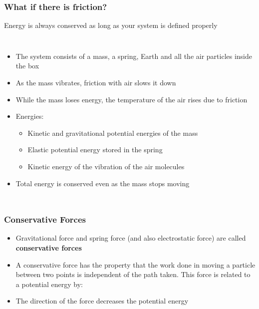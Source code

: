 \documentclass[12pt,compress,aspectratio=169]{beamer}
\newcommand{\eq}[2]{\vspace{#1}{\Large\begin{displaymath}#2\end{displaymath}}}
\begin{document}
\begin{frame}
  \frametitle{What if there is friction?}
  Energy is always conserved as long as your system is defined properly

  \begin{columns}
    \begin{itemize}
    \item The system consists of a mass, a spring, Earth and all the air
      particles inside the box
    \item As the mass vibrates, friction with air slows it down
    \item While the mass loses energy, the temperature of the air rises due to
      friction
    \item Energies:
      \begin{itemize}
      \item Kinetic and gravitational potential energies of the mass
      \item Elastic potential energy stored in the spring
      \item Kinetic energy of the vibration of the air molecules
      \end{itemize}
    \item Total energy is conserved even as the mass stops moving
    \end{itemize}
  \end{columns}
\end{frame}



\begin{frame}
  \frametitle{Conservative Forces}
  \begin{itemize}
  \item Gravitational force and spring force (and also electrostatic force)
    are called \textbf{conservative forces}
  \item A conservative force has the property that the work done in moving a
    particle
    between two points is independent of the path taken. This force is related
    to a potential energy by:
    
    \eq{-.2in}{
      \boxed{F_x=-\frac{dU}{dx}}
    }
  \item The direction of the force decreases the potential energy
  \end{itemize}
\end{frame}
\end{document}
